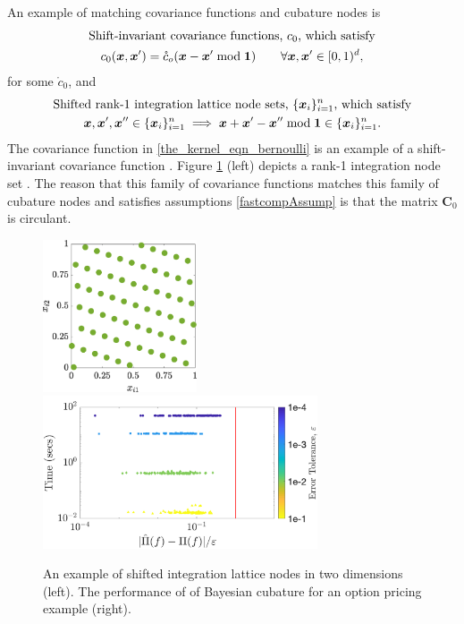 \documentclass[sts]{imsart}
\numberwithin{equation}{section}
\theoremstyle{plain}
\newcommand{\vC}{\boldsymbol{C}}
\begin{document}
An example of matching covariance functions and cubature nodes is 
\begin{multline*}
    \text{Shift-invariant covariance functions, $c_0$, which satisfy}  \\ 
    c_0(\vx, \vx') = \mathring{c}_o(\vx - \vx' \bmod \vone) \qquad \forall \vx, \vx' \in [0,1)^d,
\end{multline*}
for some $\mathring{c}_0$, and
\begin{multline*}
    \text{Shifted rank-1 integration lattice node sets, $\{\vx_i\}_{i=1}^n$, which satisfy} \\
    \vx, \vx' , \vx'' \in \{\vx_i\}_{i=1}^n \implies \vx + \vx' - \vx'' \bmod \vone \in \{\vx_i\}_{i=1}^n. 
\end{multline*}
The covariance function in \eqref{the_kernel_eqn_bernoulli} is an example of a shift-invariant covariance function \citep{Hic98b}.  Figure \ref{fig:latfig} (left) depicts a rank-1 integration node set \cite{SloJoe94,DicEtal14a}.  The reason that this family of covariance functions matches this family of cubature nodes and satisfies assumptions \eqref{fastcompAssump} is that the matrix $\vC_0$ is circulant.
\begin{figure}
    \centering
    \includegraphics[height = 4.5cm]{ShiftedLatticePoints.eps} \qquad	
    \includegraphics[height = 4.5cm]{"optPrice_guaranteed_time_full_Baker_d12_r1_2018-Sep-6"}
    \caption{An example of shifted integration lattice nodes in two dimensions (left). The performance of of Bayesian cubature for an option pricing example (right).}
    \label{fig:latfig}
\end{figure}
\end{document}
